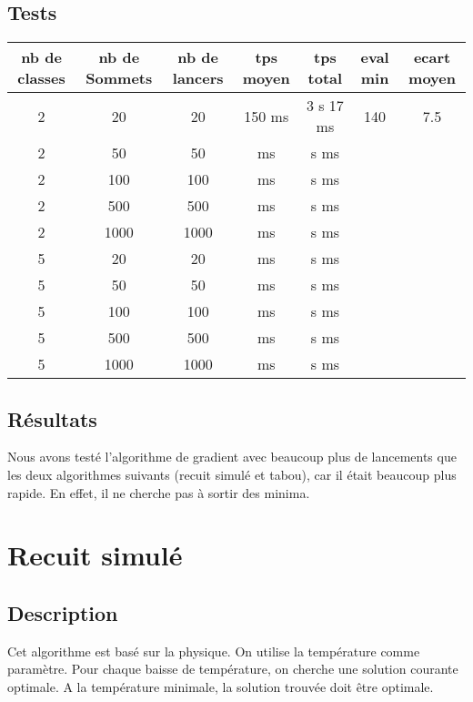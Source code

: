 \documentclass[12pt]{article}
\begin{document}
\subsection{Tests}

\begin{tabular}{|c|c|c|c|c|c|c|}
	\hline 
	nb de classes & nb de Sommets & nb de lancers & tps moyen & tps total & eval min & ecart moyen \\
	\hline
	2 & 20 & 20 & 150 ms & 3 s 17 ms & 140 & 7.5 \\
	\hline
	2 &  50  &  50  &     ms   &    s    ms   &     &     \\
	\hline
	2 &  100  &  100  &     ms   &   s    ms    &     &     \\
	\hline
	2 &  500  &  500  &      ms  &    s    ms   &     &     \\
	\hline
	2 &  1000  &  1000  &    ms    &   s    ms    &     &     \\
	\hline
	\hline
	5 &  20  &  20  &     ms   &   s    ms    &     &     \\
	\hline
	5 &  50  &  50  &     ms   &   s     ms   &     &     \\
	\hline
	5 &  100  & 100   &     ms   &   s    ms    &     &     \\
	\hline
	5 & 500   & 500   &     ms   &   s     ms   &     &     \\
	\hline
	5 &  1000  &  1000  &     ms   &   s    ms    &     &     \\
	\hline
\end{tabular}

\subsection{Résultats}

Nous avons testé l’algorithme de gradient avec beaucoup plus de lancements que les deux algorithmes suivants (recuit simulé et tabou), car il était beaucoup plus rapide. En effet, il ne cherche pas à sortir des minima.

\newpage

\section{Recuit simulé}
\subsection{Description}
Cet algorithme est basé sur la physique. On utilise la température comme paramètre. Pour chaque baisse de température, on cherche une solution courante optimale. A la température minimale, la solution trouvée doit être optimale.
\end{document}

